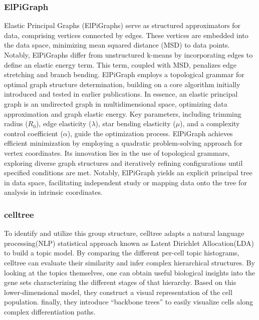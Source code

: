 \subsubsection{ElPiGraph}
 Elastic Principal Graphs (ElPiGraphs) serve as structured approximators for data, comprising vertices connected by edges. These vertices are embedded into the data space, minimizing mean squared distance (MSD) to data points. Notably, ElPiGraphs differ from unstructured k-means by incorporating edges to define an elastic energy term. This term, coupled with MSD, penalizes edge stretching and branch bending. ElPiGraph employs a topological grammar for optimal graph structure determination, building on a core algorithm initially introduced and tested in earlier publications. In essence, an elastic principal graph is an undirected graph in multidimensional space, optimizing data approximation and graph elastic energy. Key parameters, including trimming radius ($R_0$), edge elasticity ($\lambda$), star bending elasticity ($\mu$), and a complexity control coefficient ($\alpha$), guide the optimization process. ElPiGraph achieves efficient minimization by employing a quadratic problem-solving approach for vertex coordinates. Its innovation lies in the use of topological grammars, exploring diverse graph structures and iteratively refining configurations until specified conditions are met. Notably, ElPiGraph yields an explicit principal tree in data space, facilitating independent study or mapping data onto the tree for analysis in intrinsic coordinates. 
\subsubsection{celltree}
 To identify and utilize this group structure, celltree adapts a natural language processing(NLP) statistical approach known as Latent Dirichlet Allocation(LDA) to build a topic model. By comparing the different per-cell topic histograms, celltree can evaluate their similarity and infer complex hierarchical structures. By looking at the topics themselves, one can obtain useful biological insights into the gene sets characterizing the different stages of that hierarchy. Based on this lower-dimensional model, they construct a visual representation of the cell population. finally, they introduce “backbone trees” to easily visualize cells along complex differentiation paths.
